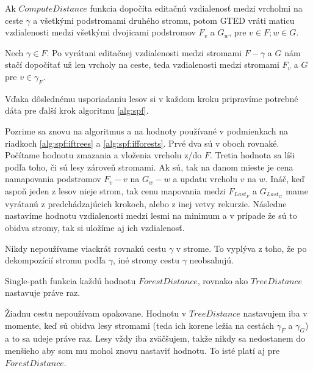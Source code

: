 \begin{lemma}
  Ak $ComputeDistance$ funkcia dopočíta editačnú vzdialenosť medzi vrcholmi na ceste $\gamma$
  a všetkými podstromami druhého stromu, potom GTED vráti maticu vzdialenosti
  medzi všetkými dvojicami podstromov $F_{v}$ a $G_{w}$, pre $v \in F; w \in G$.
\end{lemma}

\begin{dukaz}
  Nech $\gamma \in F$. Po vyrátani editačnej vzdialenosti medzi stromami
  $F - \gamma$ a $G$ nám stačí dopočítať už len vrcholy na ceste,
  teda vzdialenosti medzi stromami $F_{v}$ a $G$ pre $v \in \gamma_{F}$.
\end{dukaz}

Vďaka dôslednému usporiadaniu lesov si v každom kroku pripravíme potrebné
dáta pre ďalší krok algoritmu \ref{alg:spf}.

Pozrime sa znovu na algoritmus a na hodnoty používané v podmienkach na riadkoch
\ref{alg:spf:iftrees} a \ref{alg:spf:ifforests}. Prvé dva sú v oboch rovnaké.
Počítame hodnotu zmazania a vloženia vrcholu z/do $F$.
Tretia hodnota sa líši podľa toho, či sú lesy zároveň stromami. Ak sú, tak na danom mieste
je cena namapovania podstromov $F_{v} - v$ na $G_{w} - w$ a updatu vrcholu $v$ na $w$.
Ináč, keď aspoň jeden z lesov nieje strom, tak cenu mapovania medzi $F_{Last_{F}}$ a $G_{Last_{G}}$
mame vyrátanú z predchádzajúcich krokoch, alebo z inej vetvy rekurzie.
Následne nastavíme hodnotu vzdialenosti medzi lesmi na minimum a v prípade že sú to obidva stromy,
tak si uložíme aj ich vzdialenosť.

\begin{pozn}
  Nikdy nepoužívame viackrát rovnakú cestu $\gamma$ v strome. To vyplýva z toho, že po dekompozícií
  stromu podľa $\gamma$, iné stromy cestu $\gamma$ neobsahujú.
\end{pozn}

\begin{pozn}
  Single-path funkcia každú hodnotu $ForestDistance$, rovnako ako $TreeDistance$ nastavuje
  práve raz.
\end{pozn}

\begin{dukaz}
  Žiadnu cestu nepoužívam opakovane. Hodnotu v $TreeDistance$ nastavujem iba v momente,
  keď sú obidva lesy stromami (teda ich korene ležia na cestách $\gamma_{F}$ a $\gamma_{G}$)
  a to sa udeje práve raz.
  Lesy vždy iba zväčšujem, takže nikdy sa nedostanem do menšieho aby som mu mohol znovu nastaviť
  hodnotu. To isté platí aj pre $ForestDistance$.
\end{dukaz}

